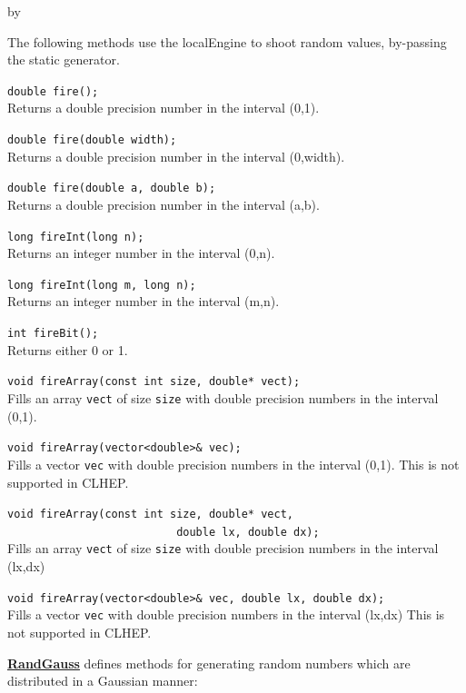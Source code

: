 \documentclass[twoside]{article}
\newcommand{\comp}[1]{\texttt{#1}}%
\newcommand{\entrylabel}[1]{\mbox{\textbf{{#1}}}\hfil}%
\newenvironment{entry}
{\begin{list}{}%
    {\renewcommand{\makelabel}{\entrylabel}%
     \setlength{\labelwidth}{90pt}%
     \setlength{\leftmargin}{\labelwidth}
     \advance\leftmargin by \labelsep%
      }%
    }%
  {\end{list}}
\newcommand{\Entrylabel}[1]%
{\raisebox{0pt}[1ex][0pt]{\makebox[\labelwidth][l]%
    {\parbox[t]{\labelwidth}{\hspace{0pt}\textbf{{#1}}}}}}
\newenvironment{Entry}%
{\renewcommand{\entrylabel}{\Entrylabel}\begin{entry}}%
  {\end{entry}}
\begin{document}
\begin{description}
\begin{Entry}
  The following methods use the localEngine to shoot random values,
  by-passing the static generator.

   \verb+double fire();+\\
   Returns a double precision number in the interval (0,1).
  
   \verb+double fire(double width);+\\
   Returns a double precision number in the interval (0,width).
   
   \verb+double fire(double a, double b);+\\
   Returns a double precision number in the interval (a,b).

   \verb+long fireInt(long n);+\\
   Returns an integer number in the interval (0,n).
  
   \verb+long fireInt(long m, long n);+\\
   Returns an integer number in the interval (m,n).

   \verb+int fireBit();+\\
   Returns either 0 or 1.
  
   \verb+void fireArray(const int size, double* vect);+\\
   Fills an array \comp{vect} of size \comp{size} with double
   precision numbers in the interval (0,1).

   \verb+void fireArray(vector<double>& vec);+\\
   Fills a vector \comp{vec} with double
   precision numbers in the interval (0,1).
   This is not supported in CLHEP.
   
   \verb+void fireArray(const int size, double* vect,+\\
   \verb+                          double lx, double dx);+\\
   Fills an array \comp{vect} of size \comp{size} with double
   precision numbers in the interval (lx,dx)

   \verb+void fireArray(vector<double>& vec, double lx, double dx);+\\
   Fills a vector \comp{vec} with double
   precision numbers in the interval (lx,dx)
   This is not supported in CLHEP.
   
   \begin{description}
     \item \underline{\bf RandGauss}  defines methods for generating random
      numbers which are distributed in a Gaussian manner:
   \end{description}
   

\end{Entry}
\end{description}
\end{document}
